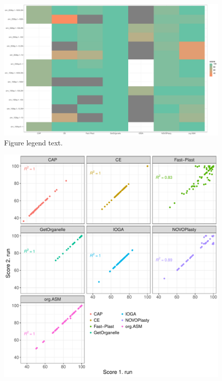 \documentclass{bmcart}
\begin{document}
\begin{backmatter}
\begin{figure}[h!]
  \includegraphics[width=\textwidth]{plots/sim_tiles.pdf}
  \caption{
      Figure legend text.}
      \label{fig:simulated}
      \end{figure}

\begin{figure}[h!]
  \includegraphics[width=\textwidth]{plots/repro.pdf}
  \caption{
      }
      \label{fig:reproducibility}
      \end{figure}


\end{backmatter}
\end{document}
